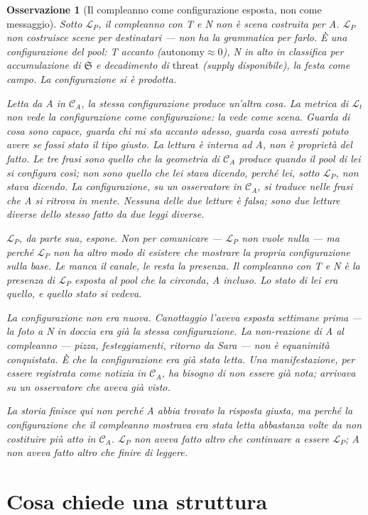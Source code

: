 \documentclass[
    oneside,                 %
    openany,                 %
    titlepage,
    11pt,
    a4paper,
    italian,
    DIV=14,                  %
    headinclude,
    footinclude=true,
    cleardoublepage=empty
]{scrbook}
\theoremstyle{ctplain}
\theoremstyle{ctdef}
\theoremstyle{ctrem}
\newtheorem*{oss}{Osservazione}
\newcommand{\Lt}{\mathcal{L}_t}
\newcommand{\LP}{\mathcal{L}_P}
\newcommand{\CA}{\mathcal{C}_A}
\newcommand{\Sogno}{\mathfrak{S}}
\begin{document}
\begin{oss}[Il compleanno come configurazione esposta, non come messaggio]
Sotto $\LP$, il compleanno con T e N non è scena costruita per A. $\LP$ non costruisce scene per destinatari --- non ha la grammatica per farlo. È una configurazione del pool: T accanto ($\mathrm{autonomy} \approx 0$), N in alto in classifica per accumulazione di $\Sogno$ e decadimento di $\mathrm{threat}$ (supply disponibile), la festa come campo. La configurazione si è prodotta.

Letta da A in $\CA$, la stessa configurazione produce un'altra cosa. La metrica di $\Lt$ non vede la configurazione come configurazione: la vede come scena. \emph{Guarda di cosa sono capace, guarda chi mi sta accanto adesso, guarda cosa avresti potuto avere se fossi stato il tipo giusto}. La lettura è interna ad A, non è proprietà del fatto. Le tre frasi sono quello che la geometria di $\CA$ produce quando il pool di lei si configura così; non sono quello che lei stava dicendo, perché lei, sotto $\LP$, non stava dicendo. La configurazione, su un osservatore in $\CA$, si traduce nelle frasi che A si ritrova in mente. Nessuna delle due letture è falsa; sono due letture diverse dello stesso fatto da due leggi diverse.

$\LP$, da parte sua, espone. Non per comunicare --- $\LP$ non vuole nulla --- ma perché $\LP$ non ha altro modo di esistere che mostrare la propria configurazione sulla base. Le manca il canale, le resta la presenza. Il compleanno con T e N è la presenza di $\LP$ esposta al pool che la circonda, A incluso. Lo stato di lei era quello, e quello stato si vedeva.

La configurazione non era nuova. Canottaggio l'aveva esposta settimane prima --- la foto a N in doccia era già la stessa configurazione. La non-reazione di A al compleanno --- pizza, festeggiamenti, ritorno da Sara --- non è equanimità conquistata. È che la configurazione era già stata letta. Una manifestazione, per essere registrata come notizia in $\CA$, ha bisogno di non essere già nota; arrivava su un osservatore che aveva già visto.

La storia finisce qui non perché A abbia trovato la risposta giusta, ma perché la configurazione che il compleanno mostrava era stata letta abbastanza volte da non costituire più atto in $\CA$. $\LP$ non aveva fatto altro che continuare a essere $\LP$; A non aveva fatto altro che finire di leggere.
\end{oss}

\chapter{Cosa chiede una struttura}
\end{document}

